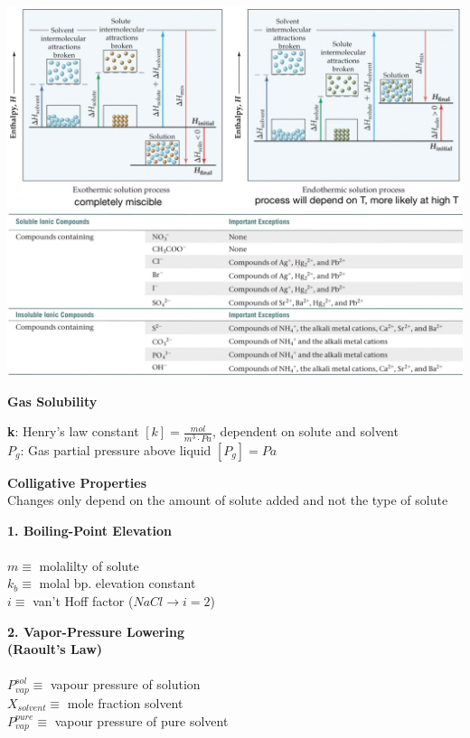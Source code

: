 \begin{center}
   \includegraphics[width = 0.9\linewidth]{images/miscible_not_miscible.jpeg} 
   \includegraphics[width = 0.95\linewidth]{images/soluibility.jpeg}
\end{center}
\begin{minipage}{0.2\linewidth}
    \textbf{Gas Solubility}\\
\end{minipage}
\begin{minipage}{0.79\linewidth}
    \textbf{k}: Henry's law constant $[k] = \frac{mol}{m^3\cdot Pa}$, dependent on solute and solvent\\
    \textbf{$P_g$}: Gas partial pressure above liquid $[P_g] = Pa$
\end{minipage}
\textbf{Colligative Properties}\\
Changes only depend on the amount of solute added and not the type of solute\\
\begin{minipage}{0.35\linewidth}
    \textbf{1. Boiling-Point Elevation}\\
    \\
    $m \equiv$ molalilty of solute\\
    $k_b \equiv$ molal bp. elevation constant\\
    $i \equiv$ van't Hoff factor ($NaCl \longrightarrow i = 2$)
\end{minipage}
\begin{minipage}{0.32\linewidth}
    \textbf{2. Vapor-Pressure Lowering \\(Raoult's Law)}\\
    \\
    $P_{vap}^{sol} \equiv$ vapour pressure of solution\\
    $X_{solvent} \equiv$ mole fraction solvent\\
    $P_{vap}^{pure} \equiv$ vapour pressure of pure solvent 
\end{minipage}
